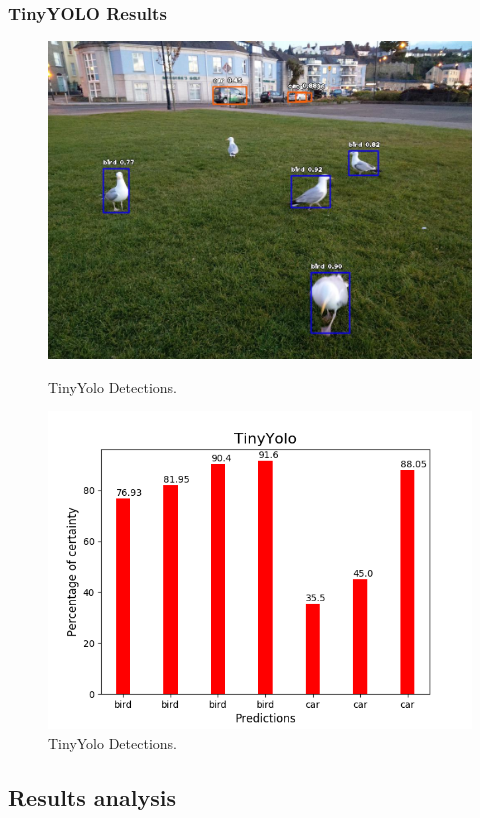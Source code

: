       \subsubsection{TinyYOLO Results}

    \begin{figure}[htb]
        \centering
        \begin{minipage}[b]{0.44\textwidth}
          \includegraphics[width=\textwidth]{Sections/4InitialWork/4_images_obj_run3/yolo_tiny.jpg}
          \caption{TinyYolo Detections.}
        \end{minipage}
        \hfill
        \begin{minipage}[b]{0.50\textwidth}
          \includegraphics[width=\textwidth]{Sections/4InitialWork/4_images_obj_run3/yolo_tiny_graph.png}
          \caption{TinyYolo Detections.}
        \end{minipage}
      \end{figure}

    \newpage
    \subsection{Results analysis}

    \label{sec:results_obj_rec}

